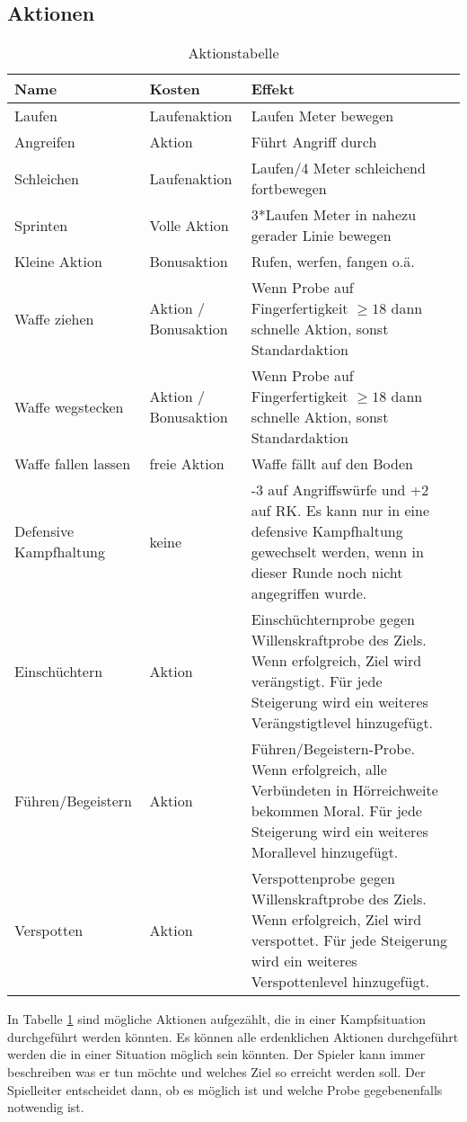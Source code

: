 \documentclass[../../Heldenanleitung2]{subfiles}
\begin{document}
\subsection{Aktionen}
\renewcommand{\arraystretch}{1.5}
\begin{table}
\caption{Aktionstabelle}
\label{tab:Aktionen}
\begin{tabular}{|p{}|p{}|p{}|}
\hline
Name & Kosten & Effekt\\
\hline
Laufen & Laufenaktion & Laufen Meter bewegen \\
Angreifen & Aktion & Führt Angriff durch \\
Schleichen & Laufenaktion & Laufen/4 Meter schleichend fortbewegen\\
Sprinten & Volle Aktion & 3*Laufen Meter in nahezu gerader Linie bewegen\\
Kleine Aktion & Bonusaktion & Rufen, werfen, fangen o.ä.\\
Waffe ziehen & Aktion / Bonusaktion & Wenn Probe auf Fingerfertigkeit $\geq 18$ dann schnelle Aktion, sonst Standardaktion\\
Waffe wegstecken & Aktion / Bonusaktion & Wenn Probe auf Fingerfertigkeit $\geq 18$ dann schnelle Aktion, sonst Standardaktion\\
Waffe fallen lassen & freie Aktion & Waffe fällt auf den Boden\\
Defensive Kampfhaltung & keine & -3 auf Angriffswürfe und +2 auf RK. Es kann nur in eine defensive Kampfhaltung gewechselt werden, wenn in dieser Runde noch nicht angegriffen wurde.\\
Einschüchtern & Aktion & Einschüchternprobe gegen Willenskraftprobe des Ziels. Wenn erfolgreich, Ziel wird verängstigt. Für jede Steigerung wird ein weiteres Verängstigtlevel hinzugefügt.\\
Führen/Begeistern & Aktion & Führen/Begeistern-Probe. Wenn erfolgreich, alle Verbündeten in Hörreichweite bekommen Moral. Für jede Steigerung wird ein weiteres Morallevel hinzugefügt.\\
Verspotten & Aktion & Verspottenprobe gegen Willenskraftprobe des Ziels. Wenn erfolgreich, Ziel wird verspottet. Für jede Steigerung wird ein weiteres Verspottenlevel hinzugefügt.\\
\hline
\end{tabular}
\end{table}
In Tabelle \ref{tab:Aktionen} sind mögliche Aktionen aufgezählt, die in einer Kampfsituation durchgeführt werden könnten. Es können alle erdenklichen Aktionen durchgeführt werden die in einer Situation möglich sein könnten. Der Spieler kann immer beschreiben was er tun möchte und welches Ziel so erreicht werden soll. Der Spielleiter entscheidet dann, ob es möglich ist und welche Probe gegebenenfalls notwendig ist.
\end{document}
